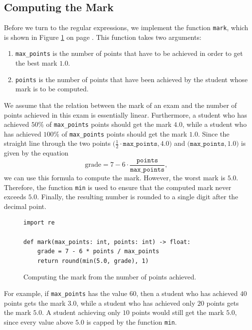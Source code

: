 \subsection{Computing the Mark}
Before we turn to the regular expressions, we implement the function \texttt{mark}, which is shown in Figure
\ref{fig:mark.py} on page \pageref{fig:mark.py}.  This function takes two arguments:
\begin{enumerate}
\item \texttt{max\_points} is the number of points that have to be achieved in order to get the best mark
      $1.0$.
\item \texttt{points} is the number of points that have been achieved by the student whose mark is to be
      computed.
\end{enumerate}
We assume that the relation between the mark of an exam and the number of points achieved in this exam is
essentially linear.  Furthermore, a student who has achieved $50\%$ of \texttt{max\_points} points should get the
mark $4.0$, while a student who has achieved $100\%$ of \texttt{max\_points} points should get the mark $1.0$.
Since the straight line through the two points $\bigl(\frac{1}{2}\cdot\texttt{max\_points}, 4.0\bigr)$ and
$\bigl(\texttt{max\_points}, 1.0\bigr)$ is given by the equation
$$\textrm{grade} = 7 - 6 \cdot \frac{\texttt{points}}{\texttt{max\_points}},$$
we can use this formula to compute the mark.  However, the worst mark is $5.0$.  Therefore, the function
\texttt{min} is used to ensure that the computed mark never exceeds $5.0$.  Finally, the resulting number is
rounded to a single digit after the decimal point.

\begin{figure}[!ht]
\centering
  \begin{verbatim}
import re

def mark(max_points: int, points: int) -> float:
    grade = 7 - 6 * points / max_points
    return round(min(5.0, grade), 1)
\end{verbatim}
\vspace*{-0.3cm}
\caption{Computing the mark from the number of points achieved.}
\label{fig:mark.py}
\end{figure}

\noindent
For example, if \texttt{max\_points} has the value $60$, then a student who has achieved $40$ points gets the
mark $3.0$, while a student who has achieved only $20$ points gets the mark $5.0$.  A student achieving only
$10$ points would still get the mark $5.0$, since every value above $5.0$ is capped by the function
\texttt{min}.


